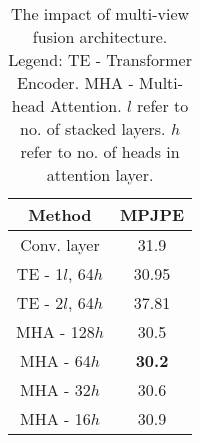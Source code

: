 


\begin{table}[t]
\color{orange}
\begin{center}
\begin{tabular}{|c|c|}
\hline
\textbf{Method} & \textbf{MPJPE} \\

\hline
Conv. layer & 31.9 \\
\hline
TE - 1$l$, 64$h$ & 30.95 \\
\hline
TE - 2$l$, 64$h$ & 37.81 \\
\hline
MHA - 128$h$ & 30.5 \\
\hline
MHA - 64$h$ & \textbf{30.2} \\
\hline
MHA - 32$h$ & 30.6 \\
\hline
MHA - 16$h$ & 30.9 \\
\hline

\end{tabular}
\end{center}
\vspace{-14pt}
\caption{The impact of multi-view fusion architecture. Legend: TE - Transformer Encoder. MHA - Multi-head Attention. $l$ refer to no. of stacked layers. $h$ refer to no. of heads in attention layer.}
\vspace{-5pt}
\label{tab:fusion_arch}
\end{table}